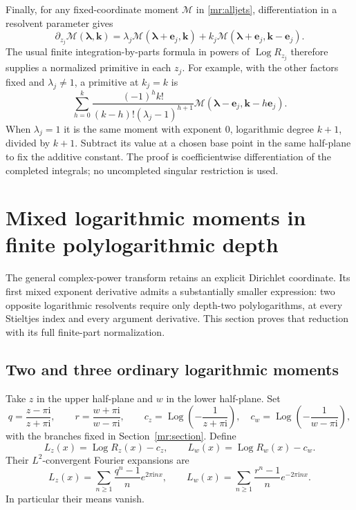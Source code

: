 \documentclass[11pt]{article}
\numberwithin{equation}{section}
\theoremstyle{plain}
\theoremstyle{definition}
\theoremstyle{remark}
\DeclareMathOperator{\Log}{Log}
\newcommand{\ii}{\mathrm i}
\begin{document}
Finally, for any fixed-coordinate moment $\mathcal M$ in
\eqref{mr:alljets}, differentiation in a resolvent parameter gives
\[
 \partial_{z_j}\mathcal M(\boldsymbol\lambda,\mathbf k)
 =\lambda_j\mathcal M(\boldsymbol\lambda+\mathbf e_j,\mathbf k)
   +k_j\mathcal M(\boldsymbol\lambda+\mathbf e_j,\mathbf k-\mathbf e_j).
\]
The usual finite integration-by-parts formula in powers of $\Log R_{z_j}$
therefore supplies a normalized primitive in each $z_j$. For example,
with the other factors fixed and $\lambda_j\ne1$, a primitive at
$k_j=k$ is
\[
 \sum_{h=0}^k\frac{(-1)^hk!}{(k-h)!(\lambda_j-1)^{h+1}}
      \mathcal M(\boldsymbol\lambda-\mathbf e_j,
                         \mathbf k-h\mathbf e_j).
\]
When $\lambda_j=1$ it is the same moment with exponent $0$, logarithmic
degree $k+1$, divided by $k+1$. Subtract its value at a chosen base point
in the same half-plane to fix the additive constant. The proof is
coefficientwise differentiation of the completed integrals; no
uncompleted singular restriction is used.



\section{Mixed logarithmic moments in finite polylogarithmic depth}
\label{ml:section}

The general complex-power transform retains an explicit Dirichlet
coordinate. Its first mixed exponent derivative admits a substantially
smaller expression: two opposite logarithmic resolvents require only
depth-two polylogarithms, at every Stieltjes index and every argument
derivative. This section proves that reduction with its full finite-part
normalization.

\subsection{Two and three ordinary logarithmic moments}

Take $z$ in the upper half-plane and $w$ in the lower half-plane. Set
\[
 q=\frac{z-\pi\ii}{z+\pi\ii},\qquad
 r=\frac{w+\pi\ii}{w-\pi\ii},\qquad
 c_z=\Log\left(-\frac1{z+\pi\ii}\right),\quad
 c_w=\Log\left(-\frac1{w-\pi\ii}\right),
\]
with the branches fixed in Section~\ref{mr:section}. Define
\[
 L_z(x)=\Log R_z(x)-c_z,\qquad
 L_w(x)=\Log R_w(x)-c_w.
\]
Their $L^2$-convergent Fourier expansions are
\begin{equation}\label{ml:Fourierlog}
 L_z(x)=\sum_{n\ge1}\frac{q^n-1}{n}e^{2\pi\ii nx},\qquad
 L_w(x)=\sum_{n\ge1}\frac{r^n-1}{n}e^{-2\pi\ii nx}.
\end{equation}
In particular their means vanish.
\end{document}
